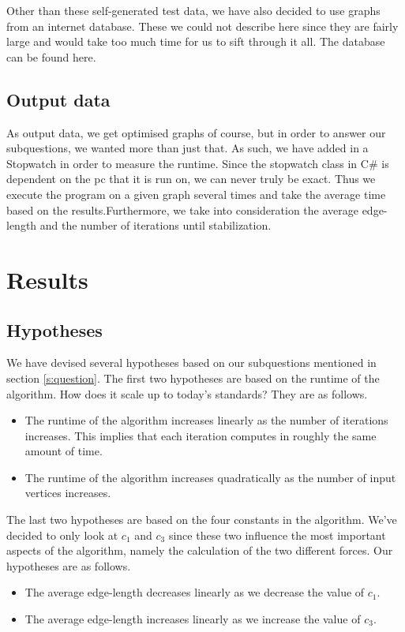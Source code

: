 \documentclass[a4paper,12pt]{article}
\begin{document}
Other than these self-generated test data, we have also decided to use graphs from an internet database. These we could not describe here since they are fairly large and would take too much time for us to sift through it all. The database can be found here\cite{Database}.
\subsection{Output data}
As output data, we get optimised graphs of course, but in order to answer our subquestions, we wanted more than just that. As such, we have added in a Stopwatch in order to measure the runtime. Since the stopwatch class in C\# is dependent on the pc that it is run on, we can never truly be exact. Thus we execute the program on a given graph several times and take the average time based on the results.Furthermore, we take into consideration the average edge-length and the number of iterations until stabilization.

\section{Results}\label{s:results}

\subsection{Hypotheses}
We have devised several hypotheses based on our subquestions mentioned in section \ref{s:question}. The first two hypotheses are based on the runtime of the algorithm. How does it scale up to today's standards? They are as follows.
\begin{itemize}
\item The runtime of the algorithm increases linearly as the number of iterations increases. This implies that each iteration computes in roughly the same amount of time.
\item The runtime of the algorithm increases quadratically as the number of input vertices increases.
\end{itemize}
The last two hypotheses are based on the four constants in the algorithm. We've decided to only look at $c_1$ and $c_3$ since these two influence the most important aspects of the algorithm, namely the calculation of the two different forces. Our hypotheses are as follows.
\begin{itemize}
\item The average edge-length decreases linearly as we decrease the value of $c_1$.
\item The average edge-length increases linearly as we increase the value of $c_3$.
\end{itemize}
\end{document}
